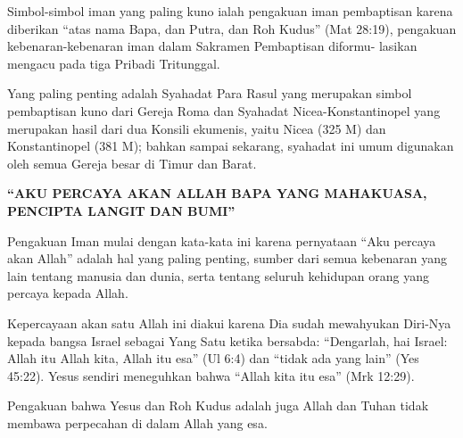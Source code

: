 \newpage
{}
\setcounter{kgkcounter}{33}
\normalsize
{}
      Simbol-simbol iman yang paling kuno ialah pengakuan iman pembaptisan karena diberikan ``atas nama Bapa, dan Putra, dan Roh Kudus'' (Mat 28:19),
pengakuan kebenaran-kebenaran iman dalam Sakramen Pembaptisan diformu-
lasikan mengacu pada tiga Pribadi Tritunggal.

     Yang paling penting adalah Syahadat Para Rasul yang merupakan simbol pembaptisan kuno dari Gereja Roma dan Syahadat Nicea-Konstantinopel
yang merupakan hasil dari dua Konsili ekumenis, yaitu Nicea (325 M) dan
Konstantinopel (381 M); bahkan sampai sekarang, syahadat ini umum digunakan
oleh semua Gereja besar di Timur dan Barat.

\begin{center}
         \textbf{``AKU PERCAYA AKAN ALLAH BAPA YANG MAHAKUASA,\\
                   PENCIPTA LANGIT DAN BUMI''}
\end{center}

     Pengakuan Iman mulai dengan kata-kata ini karena pernyataan ``Aku percaya akan Allah'' adalah hal yang paling penting, sumber dari semua kebenaran yang lain tentang manusia dan dunia, serta tentang seluruh kehidupan orang yang percaya kepada Allah.

Kepercayaan akan satu Allah ini diakui karena Dia sudah mewahyukan
Diri-Nya kepada bangsa Israel sebagai Yang Satu ketika bersabda: ``Dengarlah, hai Israel: Allah itu Allah kita, Allah itu esa'' (Ul 6:4) dan ``tidak ada yang lain'' (Yes 45:22). Yesus sendiri meneguhkan bahwa ``Allah kita itu esa'' (Mrk 12:29).

          Pengakuan bahwa Yesus dan Roh Kudus adalah juga Allah dan Tuhan tidak membawa perpecahan di dalam Allah yang esa.

